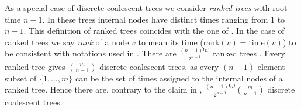 \documentclass[11pt]{amsart}
\newcommand{\rank}{\mathrm{rank}}
\newcommand{\ntime}{\mathrm{time}}
\providecommand{\DIFaddtex}[1]{{\protect\color{blue}\uwave{#1}}} %
\providecommand{\DIFaddbegin}{} %
\providecommand{\DIFaddend}{} %
\providecommand{\DIFdelbegin}{} %
\providecommand{\DIFdelend}{} %
\providecommand{\DIFadd}[1]{\texorpdfstring{\DIFaddtex{#1}}{#1}} %
\newcommand{\DIFscaledelfig}{0.5}
\newlength{\DIFdelgraphicswidth} %
\newlength{\DIFdelgraphicsheight} %
\newcommand{\DIFaddincludegraphics}[2][]{{\color{blue}\fbox{\DIFOincludegraphics[#1]{#2}}}} %
\newcommand{\DIFdelincludegraphics}[2][]{%
\sbox{\DIFdelgraphicsbox}{\DIFOincludegraphics[#1]{#2}}%
\settoboxwidth{\DIFdelgraphicswidth}{\DIFdelgraphicsbox} %
\settoboxtotalheight{\DIFdelgraphicsheight}{\DIFdelgraphicsbox} %
\scalebox{\DIFscaledelfig}{%
\parbox[b]{\DIFdelgraphicswidth}{\usebox{\DIFdelgraphicsbox}\\[-\baselineskip] \rule{\DIFdelgraphicswidth}{0em}}\llap{\resizebox{\DIFdelgraphicswidth}{\DIFdelgraphicsheight}{%
\setlength{\unitlength}{\DIFdelgraphicswidth}%
\begin{picture}(1,1)%
\thicklines\linethickness{2pt} %
{\color[rgb]{1,0,0}\put(0,0){\framebox(1,1){}}}%
{\color[rgb]{1,0,0}\put(0,0){\line( 1,1){1}}}%
{\color[rgb]{1,0,0}\put(0,1){\line(1,-1){1}}}%
\end{picture}%
}\hspace*{3pt}}} %
} %
\DeclareRobustCommand{\DIFaddbegin}{\DIFOaddbegin \let\includegraphics\DIFaddincludegraphics} %
\DeclareRobustCommand{\DIFaddend}{\DIFOaddend \let\includegraphics\DIFOincludegraphics} %
\DeclareRobustCommand{\DIFdelbegin}{\DIFOdelbegin \let\includegraphics\DIFdelincludegraphics} %
\DeclareRobustCommand{\DIFdelend}{\DIFOaddend \let\includegraphics\DIFOincludegraphics} %
\begin{document}
As a special case of discrete coalescent trees we consider \emph{ranked trees} with root time $n-1$.
In these trees internal nodes have distinct times ranging from $1$ to $n-1$.
This definition of ranked trees coincides with the one of \DIFdelbegin %
\DIFdelend \DIFaddbegin \textcite{Collienne2021} \DIFaddend.
In the case of ranked trees we say \DIFaddbegin \DIFadd{the }\DIFaddend \emph{rank} of a node $v$ to mean its time ($\rank(v) = \ntime(v)$) to be consistent with notations used in \DIFdelbegin %
\DIFdelend \DIFaddbegin \autocite{Collienne2021}\DIFaddend .
There are $\frac{(n-1)!n!}{2^{n-1}}$ ranked trees \autocite{Semple2003-nj}.
Every ranked tree gives ${m \choose n-1}$ discrete coalescent trees, as every $(n-1)$-element subset of $\{1, \ldots, m\}$ can be the set of times assigned to the internal nodes of a ranked tree.
Hence there are, contrary to the claim in \autocite{Gavryushkin2018-ol}, $\frac{(n-1)!n!}{2^{n-1}} {m \choose n-1}$ discrete coalescent trees.
\end{document}
